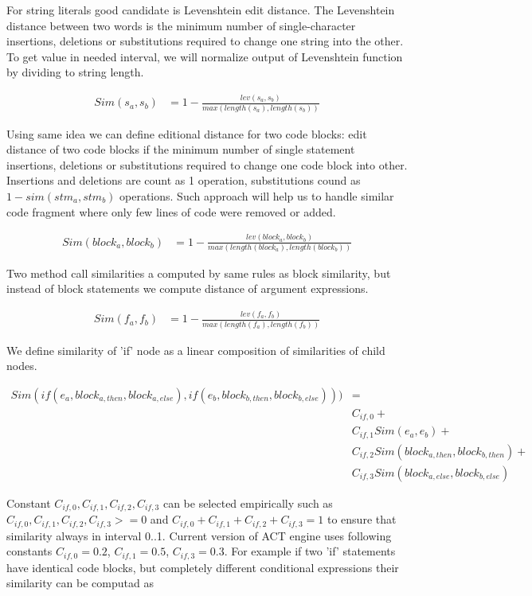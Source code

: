 For string literals good candidate is Levenshtein edit distance\cite{surveys/navarro01}. The 
Levenshtein distance between two words is the minimum number of single-character insertions, deletions or substitutions
required to change one string into the other.
To get value in needed interval, we will normalize output of Levenshtein function by dividing to string length.

\begin{align*}
Sim(s_a, s_b) &= 1 - \frac{lev(s_a,s_b)}{max(length(s_a), length(s_b))}
\end{align*}

Using same idea we can define editional distance for two code blocks: edit distance of two code blocks if the minimum
number of single statement insertions, deletions or substitutions required to change one code block into other.
Insertions and deletions are count as 1 operation, substitutions cound as $1 - sim(stm_a, stm_b)$ operations. Such
approach will help us to handle similar code fragment where only few lines of code were removed or added.

\begin{align*}
	Sim(block_a, block_b) &= 1 - \frac{lev(block_a,block_b)}{max(length(block_a), length(block_b))}
\end{align*}

Two method call similarities a computed by same rules as block similarity, but instead of block statements we compute
distance of argument expressions.

\begin{align*}
	Sim(f_a, f_b) &= 1 - \frac{lev(f_a,f_b)}{max(length(f_a), length(f_b))}
\end{align*}

We define similarity of 'if' node as a linear composition of similarities of child nodes. 

\begin{align*}
	Sim(if(e_a, block_{a,then}, block_{a,else}), if(e_b, block_{b,then}, block_{b,else}))) &= \\
	&C_{if,0} + \\
	&C_{if,1} Sim(e_a, e_b) + \\
	&C_{if,2} Sim(block_{a,then}, block_{b,then}) + \\
	&C_{if,3} Sim(block_{a,else}, block_{b,else})
\end{align*}

Constant $C_{if,0}, C_{if,1}, C_{if,2}, C_{if,3}$ can be selected empirically such as $C_{if,0}, C_{if,1}, C_{if,2},
C_{if,3} >= 0$ and $C_{if,0} + C_{if,1} + C_{if,2} + C_{if,3} = 1$ to ensure that similarity always in interval 0..1.
Current version of ACT engine uses following constants $C_{if,0} = 0.2$, $C_{if,1} = 0.5$, $C_{if,3} = 0.3$.
For example if two 'if' statements have identical code blocks, but completely different conditional expressions their
similarity can be computad as


